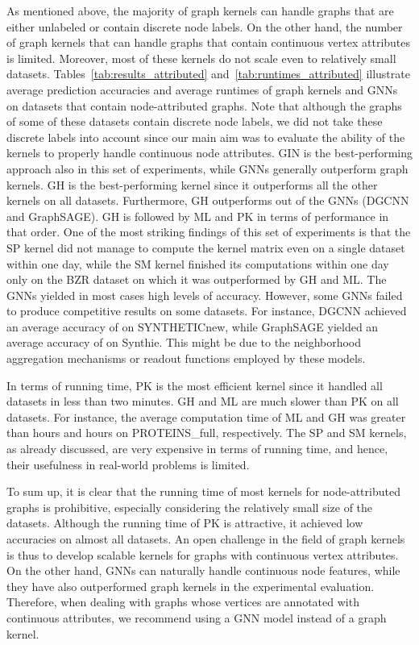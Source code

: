 \documentclass[twoside,11pt]{article}
\begin{document}
As mentioned above, the majority of graph kernels can handle graphs that are either unlabeled or contain discrete node labels.
On the other hand, the number of graph kernels that can handle graphs that contain continuous vertex attributes is limited.
Moreover, most of these kernels do not scale even to relatively small datasets.
Tables~\ref{tab:results_attributed} and~\ref{tab:runtimes_attributed} illustrate average prediction accuracies and average runtimes of graph kernels and GNNs on datasets that contain node-attributed graphs.
Note that although the graphs of some of these datasets contain discrete node labels, we did not take these discrete labels into account since our main aim was to evaluate the ability of the kernels to properly handle continuous node attributes.
GIN is the best-performing approach also in this set of experiments, while GNNs generally outperform graph kernels.
GH is the best-performing kernel since it outperforms all the other kernels on all datasets.
Furthermore, GH outperforms  out of the  GNNs (DGCNN and GraphSAGE).
GH is followed by ML and PK in terms of performance in that order.
One of the most striking findings of this set of experiments is that the SP kernel did not manage to compute the kernel matrix even on a single dataset within one day, while the SM kernel finished its computations within one day only on the BZR dataset on which it was outperformed by GH and ML.
The  GNNs yielded in most cases high levels of accuracy.
However, some GNNs failed to produce competitive results on some datasets.
For instance, DGCNN achieved an average accuracy of  on SYNTHETICnew, while GraphSAGE yielded an average accuracy of  on Synthie.
This might be due to the neighborhood aggregation mechanisms or readout functions employed by these models.

In terms of running time, PK is the most efficient kernel since it handled all datasets in less than two minutes.
GH and ML are much slower than PK on all datasets.
For instance, the average computation time of ML and GH was greater than  hours and  hours on PROTEINS\_full, respectively.
The SP and SM kernels, as already discussed, are very expensive in terms of running time, and hence, their usefulness in real-world problems is limited.

To sum up, it is clear that the running time of most kernels for node-attributed graphs is prohibitive, especially considering the relatively small size of the datasets.
Although the running time of PK is attractive, it achieved low accuracies on almost all datasets.
An open challenge in the field of graph kernels is thus to develop scalable kernels for graphs with continuous vertex attributes.
On the other hand, GNNs can naturally handle continuous node features, while they have also outperformed graph kernels in the experimental evaluation.
Therefore, when dealing with graphs whose vertices are annotated with continuous attributes, we recommend using a GNN model instead of a graph kernel.
\end{document}
